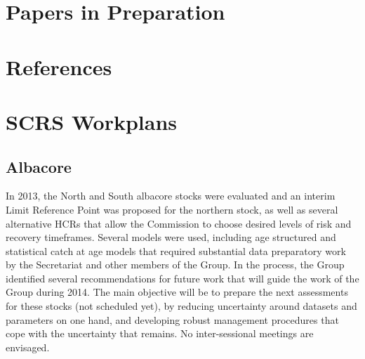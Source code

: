\documentclass[a4paper,10pt]{article}
\begin{document}
\section{Papers in Preparation}


\newpage\clearpage
\section{References}


\newpage
\section{SCRS Workplans}

\subsection{Albacore}

In 2013, the North and South albacore stocks were evaluated and an interim Limit Reference Point was proposed for the northern stock, as well as several alternative HCRs that allow the Commission to choose desired levels of risk and recovery timeframes. Several models were used, including age structured and statistical catch at age models that required substantial data preparatory work by the Secretariat and other members of the Group. In the process, the Group identified several recommendations for future work that will guide the work of the Group during 2014. The main objective will be to prepare the next assessments for these stocks (not scheduled yet), by reducing uncertainty around datasets and parameters on one hand, and developing robust management procedures that cope with the uncertainty that remains. No inter-sessional meetings are envisaged.
\end{document}
